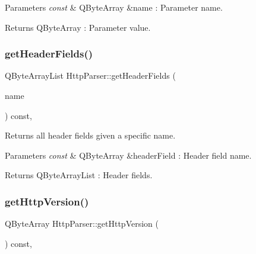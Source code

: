 \begin{DoxyParams}{Parameters}
{\em const} & Q\+Byte\+Array \&name \+: Parameter name. \\
\hline
\end{DoxyParams}
\begin{DoxyReturn}{Returns}
Q\+Byte\+Array \+: Parameter value. 
\end{DoxyReturn}
\mbox{\label{class_http_parser_ab29e0fad07ccfa2ad565d1cc32da76cc}} 
\subsubsection{\texorpdfstring{get\+Header\+Fields()}{getHeaderFields()}}
{\footnotesize\ttfamily Q\+Byte\+Array\+List Http\+Parser\+::get\+Header\+Fields (\begin{DoxyParamCaption}\item[{const Q\+Byte\+Array \&}]{name }\end{DoxyParamCaption}) const\hspace{0.3cm}{\ttfamily [inline]}, {\ttfamily [noexcept]}}



Returns all header fields given a specific name. 


\begin{DoxyParams}{Parameters}
{\em const} & Q\+Byte\+Array \&header\+Field \+: Header field name. \\
\hline
\end{DoxyParams}
\begin{DoxyReturn}{Returns}
Q\+Byte\+Array\+List \+: Header fields. 
\end{DoxyReturn}
\mbox{\label{class_http_parser_a58b5506be135040e9c1c1aa84be3090a}} 
\subsubsection{\texorpdfstring{get\+Http\+Version()}{getHttpVersion()}}
{\footnotesize\ttfamily Q\+Byte\+Array Http\+Parser\+::get\+Http\+Version (\begin{DoxyParamCaption}{ }\end{DoxyParamCaption}) const\hspace{0.3cm}{\ttfamily [inline]}, {\ttfamily [noexcept]}}




